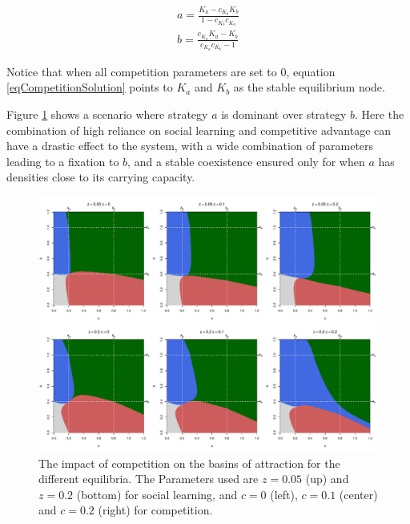\documentclass[review,authoryear]{elsarticle}
\begin{document}
\begin{equation}
\begin{aligned}
a=\frac{K_a-c_{K_b}K_b}{1-c_{K_b}c_{K_a}}\\
b=\frac{c_{K_a}K_a-K_b}{c_{K_a}c_{K_b}-1}
\label{eqCompetitionSolution}
\end{aligned}
\end{equation}

Notice that when all competition parameters are set to 0, equation \ref{eqCompetitionSolution} points to $K_a$ and $K_b$ as the stable equilibrium node. 

Figure \ref{fig:competition} shows a scenario where strategy $a$ is dominant over strategy $b$. Here the combination of high reliance on social learning and competitive advantage can have a drastic effect to the system, with a wide combination of parameters leading to a fixation to $b$, and a stable coexistence ensured only for when $a$ has densities close to its carrying capacity.

\begin{figure}[h!]
  \centering
      \includegraphics[width=\textwidth]{./figures/figure7}
  \caption{The impact of competition on the basins of attraction for the different equilibria. The Parameters used are $z=0.05$ (up) and $z=0.2$ (bottom) for social learning, and $c=0$ (left), $c=0.1$ (center) and $c=0.2$ (right) for competition.}
    \label{fig:competition}
\end{figure}

\end{document}
